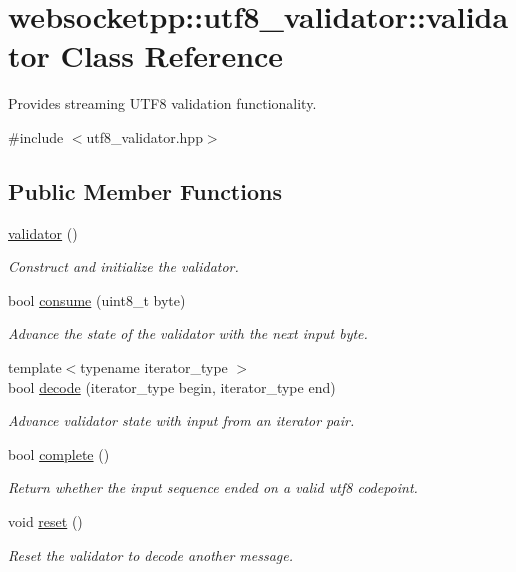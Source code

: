 \hypertarget{classwebsocketpp_1_1utf8__validator_1_1validator}{}\section{websocketpp\+:\+:utf8\+\_\+validator\+:\+:validator Class Reference}
\label{classwebsocketpp_1_1utf8__validator_1_1validator}


Provides streaming U\+T\+F8 validation functionality.  




{\ttfamily \#include $<$utf8\+\_\+validator.\+hpp$>$}

\subsection*{Public Member Functions}
\begin{DoxyCompactItemize}
\item 
\hyperlink{classwebsocketpp_1_1utf8__validator_1_1validator_a41ea90fb7c6b34d41a8e6e71a6b04346}{validator} ()
\begin{DoxyCompactList}\small\item\em Construct and initialize the validator. \end{DoxyCompactList}\item 
bool \hyperlink{classwebsocketpp_1_1utf8__validator_1_1validator_ada7f6cdd4261d848d51d7ba0bd9d28b4}{consume} (uint8\+\_\+t byte)
\begin{DoxyCompactList}\small\item\em Advance the state of the validator with the next input byte. \end{DoxyCompactList}\item 
{\footnotesize template$<$typename iterator\+\_\+type $>$ }\\bool \hyperlink{classwebsocketpp_1_1utf8__validator_1_1validator_a2cde6cad6f1a0f66674010848ec80fba}{decode} (iterator\+\_\+type begin, iterator\+\_\+type end)
\begin{DoxyCompactList}\small\item\em Advance validator state with input from an iterator pair. \end{DoxyCompactList}\item 
bool \hyperlink{classwebsocketpp_1_1utf8__validator_1_1validator_a89deb3bdfd8b94da908b806e543491ba}{complete} ()
\begin{DoxyCompactList}\small\item\em Return whether the input sequence ended on a valid utf8 codepoint. \end{DoxyCompactList}\item 
void \hyperlink{classwebsocketpp_1_1utf8__validator_1_1validator_a98aa3058213a650997bd832cc003da75}{reset} ()
\begin{DoxyCompactList}\small\item\em Reset the validator to decode another message. \end{DoxyCompactList}\end{DoxyCompactItemize}


